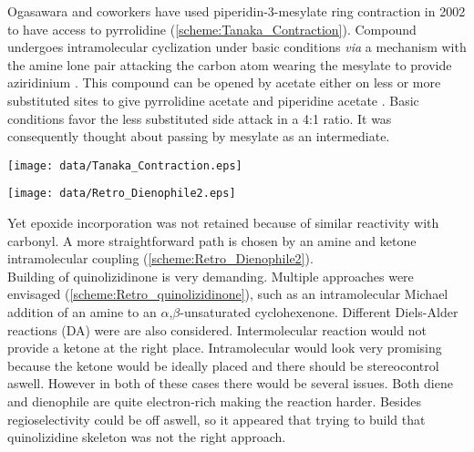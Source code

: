 Ogasawara and coworkers have used piperidin-3-mesylate ring contraction in 2002\autocite{Tanaka02} to have access to pyrrolidine (\ref{scheme:Tanaka_Contraction}). Compound  undergoes intramolecular cyclization under basic conditions \textit{via} a  mechanism with the amine lone pair attacking the carbon atom wearing the mesylate to provide aziridinium . This compound can be opened by acetate either on less or more substituted sites to give pyrrolidine acetate  and piperidine acetate . Basic conditions favor the less substituted side attack in a 4:1 ratio. It was consequently thought about passing by mesylate  as an intermediate.
\begin{figure''}
\centering
 		\texttt{[image: data/Tanaka\_Contraction.eps]}	
    \label{scheme:Tanaka_Contraction}
\end{figure''}
\vspace{-20pt}
\begin{figure''}
\centering
 		\texttt{[image: data/Retro\_Dienophile2.eps]}	
    \label{scheme:Retro_Dienophile2}
\end{figure''}
Yet epoxide incorporation was not retained because of similar reactivity with carbonyl. A more straightforward path is chosen by an amine and ketone intramolecular coupling (\ref{scheme:Retro_Dienophile2}).\\
Building of quinolizidinone is very demanding. Multiple approaches were envisaged (\ref{scheme:Retro_quinolizidinone}), such as an intramolecular Michael addition of an amine to an $\alpha$,$\beta$-unsaturated cyclohexenone. Different Diels-Alder reactions (DA) were are also considered. Intermolecular reaction would not provide a ketone at the right place. Intramolecular would look very promising because the ketone would be ideally placed and there should be stereocontrol aswell. However in both of these cases there would be several issues. Both diene and dienophile are quite electron-rich making the reaction harder. Besides regioselectivity could be off aswell, so it appeared that trying to build that quinolizidine skeleton was not the right approach.
